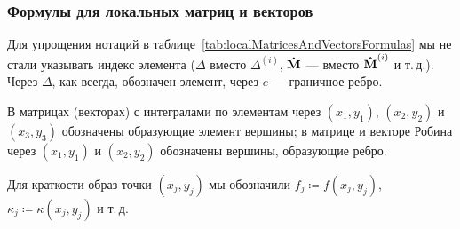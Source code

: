 \newpage
\vfill
\begin{landscape}
	\subsubsection{Формулы для локальных матриц и векторов}
	\label{localMatricesAndVectors}
	
	Для упрощения нотаций в таблице~\ref{tab:localMatricesAndVectorsFormulas} мы не стали указывать индекс элемента ($\Delta$ вместо $\Delta^{(i)}$, $\boldsymbol{\mathbf{\hat{M}}}$ --- вместо $\boldsymbol{\mathbf{\hat{M}}}^{(i)}$ и т.\,д.). Через $\Delta$, как всегда, обозначен элемент, через $e$ --- граничное ребро.
	
	В матрицах (векторах) с интегралами по элементам через $(x_1, y_1)$, $(x_2, y_2)$ и $(x_3, y_3)$ обозначены образующие элемент вершины; в матрице и векторе Робина через  $(x_1, y_1)$ и $(x_2, y_2)$ обозначены вершины, образующие ребро.  
	
	Для краткости образ точки $(x_j, y_j)$ мы обозначили $f_j \coloneqq f(x_j, y_j)$, $\kappa_j \coloneqq \kappa(x_j, y_j)$ и т.\,д.
	

\end{landscape}
